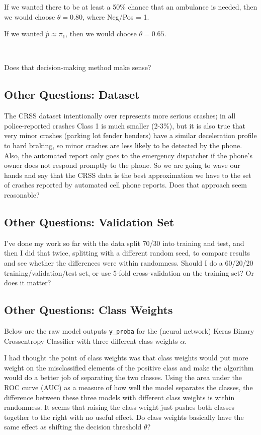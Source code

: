If we wanted there to be at least a 50\% chance that an ambulance is needed, then we would choose $\theta = 0.80$, where Neg/Pos = 1.  

If we wanted $\hat{p} \approx \pi_1$, then we would choose $\theta = 0.65$.  

\

Does that decision-making method make sense?

\subsection{Other Questions:  Dataset}

The CRSS dataset intentionally over represents more serious crashes; in all police-reported crashes Class 1 is much smaller (2-3\%), but it is also true that very minor crashes (parking lot fender benders) have a similar deceleration profile to hard braking, so minor crashes are less likely to be detected by the phone.   Also, the automated report only goes to the emergency dispatcher if the phone's owner does not respond promptly to the phone.  So we are going to wave our hands and say that the CRSS data is the best approximation we have to the set of crashes reported by automated cell phone reports.  Does that approach seem reasonable?

\subsection{Other Questions:  Validation Set}

I've done my work so far with the data split 70/30 into training and test, and then I did that twice, splitting with a different random seed, to compare results and see whether the differences were within randomness.  Should I do a 60/20/20 training/validation/test set, or use 5-fold cross-validation on the training set?  Or does it matter?  

\newpage
\subsection{Other Questions:  Class Weights}

Below are the raw model outputs \verb|y_proba| for the (neural network) Keras Binary Crossentropy Classifier with three different class weights $\alpha$.  

I had thought the point of class weights was that class weights would put more weight on the misclassified elements of the positive class and make the algorithm would do a better job of separating the two classes.  Using the area under the ROC curve (AUC) as a measure of how well the model separates the classes, the difference between these three models with different class weights is within randomness.  It seems that raising the class weight just pushes both classes together to the right with no useful effect.  Do class weights basically have the same effect as shifting the decision threshold $\theta$?

